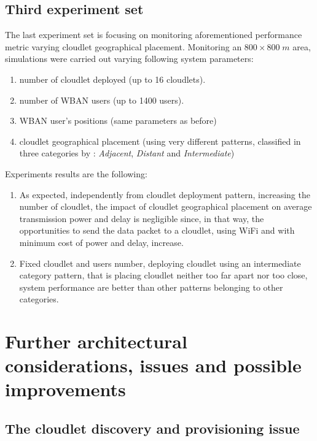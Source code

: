 \documentclass[sigchi]{acmart}
\begin{document}
\subsection{Third experiment set}

The last experiment set is focusing on monitoring aforementioned performance metric varying cloudlet geographical placement. Monitoring an $800 \times 800 \; m$ area, simulations were carried out varying following system parameters:

\begin{enumerate}
\item number of cloudlet deployed (up to 16 cloudlets).
\item number of WBAN users (up to 1400 users).
\item WBAN user's positions (same parameters as before)
\item cloudlet geographical placement (using very different patterns, classified in three categories by \citet{MSAReport}: \textit{Adjacent}, \textit{Distant} and \textit{Intermediate})
\end{enumerate}

Experiments results are the following:

\begin{enumerate}

\item As expected, independently from cloudlet deployment pattern, increasing the number of cloudlet, the impact of cloudlet geographical placement on average transmission power and delay is negligible since, in that way, the opportunities to send the data packet to a cloudlet, using WiFi and with minimum cost of power and delay, increase.

\item Fixed cloudlet and users number, deploying cloudlet using an intermediate category pattern, that is placing cloudlet neither too far apart nor too close, system performance are better than other patterns belonging to other categories.

\end{enumerate}

\section{Further architectural considerations, issues and possible improvements}

\subsection{The cloudlet discovery and provisioning issue}
\end{document}
